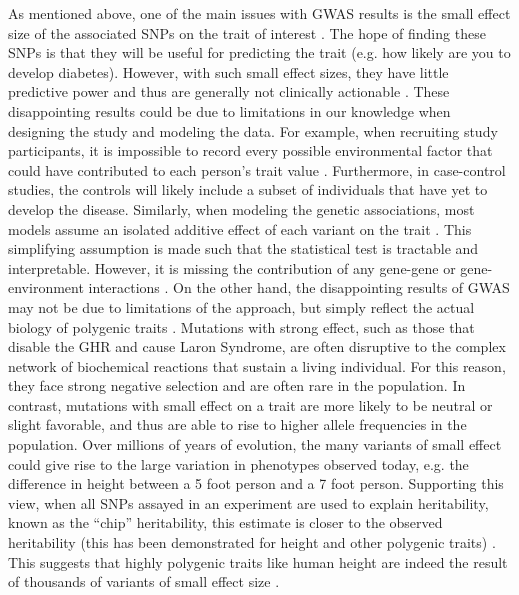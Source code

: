 As mentioned above, one of the main issues with GWAS results is the
small effect size of the associated SNPs on the trait of interest \citep{Manolio2009}. The
hope of finding these SNPs is that they will be useful for predicting
the trait (e.g. how likely are you to develop diabetes). However, with
such small effect sizes, they have little predictive power and thus
are generally not clinically actionable \citep{Torres2013, Wray2013}. These disappointing results
could be due to limitations in our knowledge when designing the study
and modeling the data. For example, when recruiting study
participants, it is impossible to record every possible environmental
factor that could have contributed to each person’s trait
value \citep{Ober2011}. Furthermore, in case-control studies, the controls will likely
include a subset of individuals that have yet to develop the
disease. Similarly, when modeling the genetic associations, most
models assume an isolated additive effect of each variant on the
trait \citep{Cordell2009}. This simplifying assumption is made such that the statistical
test is tractable and interpretable. However, it is missing the
contribution of any gene-gene or gene-environment interactions \citep{Lappalainen2011, Ackermann2012, Huang2012}. On the
other hand, the disappointing results of GWAS may not be due to
limitations of the approach, but simply reflect the actual biology of
polygenic traits \citep{DiRienzo2006, Bodmer2008, Schork2009}. Mutations with strong effect, such as those that
disable the GHR and cause Laron Syndrome, are often disruptive to the
complex network of biochemical reactions that sustain a living
individual. For this reason, they face strong negative selection and
are often rare in the population. In contrast, mutations with small
effect on a trait are more likely to be neutral or slight favorable,
and thus are able to rise to higher allele frequencies in the
population. Over millions of years of evolution, the many variants of
small effect could give rise to the large variation in phenotypes
observed today, e.g. the difference in height between a 5 foot person
and a 7 foot person. Supporting this view, when all SNPs assayed in an
experiment are used to explain heritability, known as the “chip”
heritability, this estimate is closer to the observed
heritability (this has been demonstrated for height and other polygenic traits) \citep{Yang2010, Lee2011}. This suggests that highly polygenic traits like human
height are indeed the result of thousands of variants of small effect
size \citep{Wood2014}.

